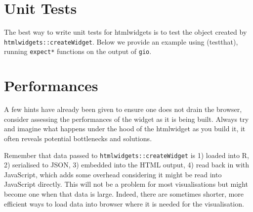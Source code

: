 \documentclass[
]{krantz}
\makeatletter
\newenvironment{Shaded}{\begin{snugshade}}{\end{snugshade}}
\newcommand{\CommentTok}[1]{\textcolor[rgb]{0.37,0.37,0.37}{\textit{#1}}}
\newcommand{\KeywordTok}[1]{\textcolor[rgb]{0.27,0.27,0.27}{\textbf{#1}}}
\newcommand{\NormalTok}[1]{#1}
\newcommand{\OperatorTok}[1]{\textcolor[rgb]{0.43,0.43,0.43}{\textbf{#1}}}
\newcommand{\StringTok}[1]{\textcolor[rgb]{0.5,0.5,0.5}{#1}}
\newenvironment{kframe}{%
\medskip{}
\setlength{\fboxsep}{.8em}
 \def\at@end@of@kframe{}%
 \ifinner\ifhmode%
  \def\at@end@of@kframe{\end{minipage}}%
  \begin{minipage}{\columnwidth}%
 \fi\fi%
 \def\FrameCommand##1{\hskip\@totalleftmargin \hskip-\fboxsep
 \colorbox{shadecolor}{##1}\hskip-\fboxsep
     \hskip-\linewidth \hskip-\@totalleftmargin \hskip\columnwidth}%
 \MakeFramed {\advance\hsize-\width
   \@totalleftmargin\z@ \linewidth\hsize
   \@setminipage}}%
 {\par\unskip\endMakeFramed%
 \at@end@of@kframe}
\renewenvironment{Shaded}{\begin{kframe}}{\end{kframe}}
\makeatother
\begin{document}
\hypertarget{unit-tests}{%
\section*{Unit Tests}\label{unit-tests}}


The best way to write unit tests for htmlwidgets is to test the object created by \texttt{htmlwidgets::createWidget}. Below we provide an example using (testthat)\citep{R-testthat}, running \texttt{expect*} functions on the output of \texttt{gio}.

\begin{Shaded}
\end{Shaded}

\hypertarget{performances}{%
\section*{Performances}\label{performances}}


A few hints have already been given to ensure one does not drain the browser, consider assessing the performances of the widget as it is being built. Always try and imagine what happens under the hood of the htmlwidget as you build it, it often reveals potential bottlenecks and solutions.

Remember that data passed to \texttt{htmlwidgets::createWidget} is 1) loaded into R, 2) serialised to JSON, 3) embedded into the HTML output, 4) read back in with JavaScript, which adds some overhead considering it might be read into JavaScript directly. This will not be a problem for most visualisations but might become one when that data is large. Indeed, there are sometimes shorter, more efficient ways to load data into browser where it is needed for the visualisation.
\end{document}
